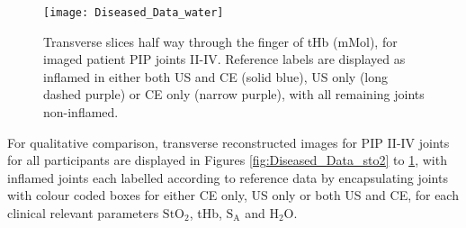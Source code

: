 \documentclass[twoside]{bhamthesis}
\theoremstyle{definition}
\begin{document}
\begin{figure}[!ht]
\centering\texttt{[image: Diseased\_Data\_water]}
\caption{Transverse slices half way through the finger of tHb (mMol), for imaged patient PIP joints II-IV. Reference labels are displayed as inflamed in either both US and CE (solid blue), US only (long dashed purple) or CE only (narrow purple), with all remaining joints non-inflamed.}
\label{fig:Diseased_Data_water}
\end{figure}

For qualitative comparison, transverse reconstructed images for PIP II-IV joints for all participants are displayed in Figures \ref{fig:Diseased_Data_sto2} to \ref{fig:Diseased_Data_water}, with inflamed joints each labelled according to reference data by encapsulating joints with colour coded boxes for either CE only, US only or both US and CE, for each clinical relevant parameters $\mathrm{StO_2}$, tHb, $\mathrm{S_A}$ and $\mathrm{H_2O}$.
\end{document}
